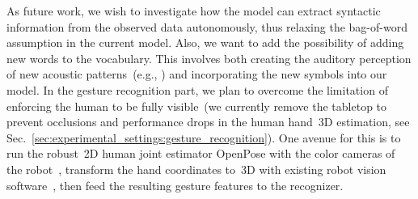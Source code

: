 As future work, we wish to investigate how the model can extract syntactic information from the observed data autonomously, thus relaxing the bag-of-word assumption in the current model.
Also, we want to add the possibility of adding new words to the vocabulary.
This involves both creating the auditory perception of new acoustic patterns~(e.g., \cite{falstrom:2017:glu, vanhainen2014:icassp, vanhainen:2012:interspeech}) and incorporating the new symbols into our \AffWords{} model.
In the gesture recognition part, we plan to overcome the limitation of enforcing the human to be fully visible~(we currently remove the tabletop to prevent occlusions and performance drops in the human hand~3D estimation, see Sec.~\ref{sec:experimental_settings:gesture_recognition}).
One avenue for this is to run the robust~2D human joint estimator OpenPose with the color cameras of the robot~\cite{cao:2017:openpose-cpvr}, transform the hand coordinates to~3D with existing robot vision software~\cite{roncone:2016:rss}, then feed the resulting gesture features to the recognizer.



